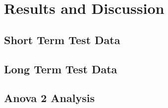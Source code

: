 \section{Results and Discussion}
\label{sec:results}

\subsection{Short Term Test Data}


\subsection{Long Term Test Data}


\subsection{Anova 2 Analysis}

